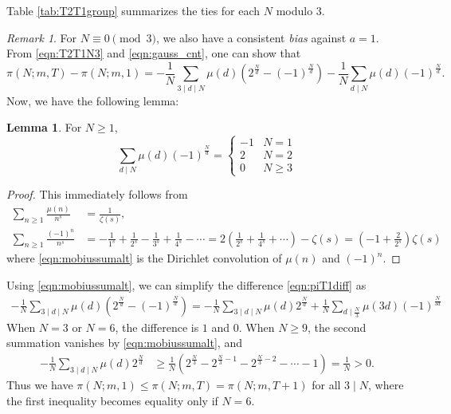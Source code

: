 \documentclass[10pt,reqno]{amsproc}
\newcommand{\1}{\mathds{1}}	%
\theoremstyle{definition}
\newtheorem{lemma}[theorem]{Lemma}
\theoremstyle{remark}
\newtheorem{remark}[theorem]{Remark}
\begin{document}
Table \ref{tab:T2T1group} summarizes the ties for each $N$ modulo 3.

\begin{remark}
\label{rmk:T2T1bias}
    For $N \equiv 0 \pmod{3}$, we also have a consistent \emph{bias} against $a = 1$.
    From \eqref{eqn:T2T1N3} and \eqref{eqn:gauss_cnt}, one can show that
    \begin{equation}
        \label{eqn:piT1diff}
        \pi(N; m, T) - \pi(N; m, 1) = - \frac{1}{N} \sum_{3 \mid d \mid N} \mu(d) (2^{\frac{N}{d}} - (-1)^{\frac{N}{d}}) - \frac{1}{N} \sum_{d \mid N} \mu(d) (-1)^{\frac{N}{d}}.
    \end{equation}
    Now, we have the following lemma:
    \begin{lemma}
    For $N \ge 1$,
    \begin{equation}
        \label{eqn:mobiussumalt}
        \sum_{d \mid N} \mu(d) (-1)^{\frac{N}{d}} = \begin{cases}
            -1 & N = 1\\ 2 & N = 2 \\ 0 & N \ge 3
        \end{cases}
    \end{equation}
    \end{lemma}
    \begin{proof}
    This immediately follows from
    \begin{align*}
        \sum_{n \ge 1} \frac{\mu(n)}{n^s} &= \frac{1}{\zeta(s)},\\
        \sum_{n \ge 1} \frac{(-1)^n}{n^s} &= -\frac{1}{1^s} + \frac{1}{2^s} - \frac{1}{3^s} + \frac{1}{4^s} - \cdots = 2\left(\frac{1}{2^s} + \frac{1}{4^s} + \cdots\right) - \zeta(s) = \left(-1 + \frac{2}{2^s}\right)\zeta(s)
    \end{align*}
    where \eqref{eqn:mobiussumalt} is the Dirichlet convolution of $\mu(n)$ and $(-1)^n$.
    \end{proof}
    Using \eqref{eqn:mobiussumalt}, we can simplify the difference \eqref{eqn:piT1diff} as
    \begin{align*}
        -\frac{1}{N} \sum_{3 \mid d \mid N} \mu(d)(2^{\frac{N}{d}} - (-1)^{\frac{N}{d}}) = -\frac{1}{N} \sum_{3 \mid d \mid N} \mu(d) 2^{\frac{N}{d}} + \frac{1}{N} \sum_{d \mid \frac{N}{3}} \mu(3d) (-1)^{\frac{N}{3d}}
    \end{align*}
    When $N = 3$ or $N = 6$, the difference is $1$ and $0$.
    When $N \ge 9$, the second summation vanishes by \eqref{eqn:mobiussumalt}, and
    \begin{align*}
        -\frac{1}{N} \sum_{3 \mid d \mid N} \mu(d) 2^{\frac{N}{d}}
        &\ge \frac{1}{N} (2^{\frac{N}{3}} - 2^{\frac{N}{3}-1} - 2^{\frac{N}{3}-2} - \cdots - 1) = \frac{1}{N} > 0.
    \end{align*}
    Thus we have $\pi(N; m, 1) \le \pi(N; m, T) = \pi(N; m, T + 1)$ for all $3 \mid N$, where the first inequality becomes equality only if $N = 6$.
\end{remark}
\end{document}
